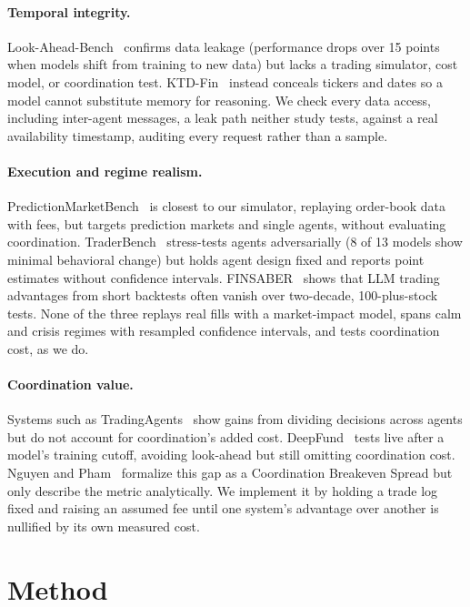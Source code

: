 \documentclass{article}
\begin{document}
\paragraph{Temporal integrity.}

Look-Ahead-Bench~\cite{benhenda2026} confirms data leakage (performance drops over 15 points when models shift from training to new data) but lacks a trading simulator, cost model, or coordination test. KTD-Fin~\cite{zhu2026ktdfin} instead conceals tickers and dates so a model cannot substitute memory for reasoning. We check every data access, including inter-agent messages, a leak path neither study tests, against a real availability timestamp, auditing every request rather than a sample.

\paragraph{Execution and regime realism.}

PredictionMarketBench~\cite{arora2026} is closest to our simulator, replaying order-book data with fees, but targets prediction markets and single agents, without evaluating coordination. TraderBench~\cite{yuan2026traderbench} stress-tests agents adversarially (8 of 13 models show minimal behavioral change) but holds agent design fixed and reports point estimates without confidence intervals. FINSABER~\cite{li2025finsaber} shows that LLM trading advantages from short backtests often vanish over two-decade, 100-plus-stock tests. None of the three replays real fills with a market-impact model, spans calm and crisis regimes with resampled confidence intervals, and tests coordination cost, as we do.

\paragraph{Coordination value.}

Systems such as TradingAgents~\cite{xiao2024ta} show gains from dividing decisions across agents but do not account for coordination's added cost. DeepFund~\cite{li2025deepfund} tests live after a model's training cutoff, avoiding look-ahead but still omitting coordination cost. Nguyen and Pham~\cite{nguyen2026} formalize this gap as a Coordination Breakeven Spread but only describe the metric analytically. We implement it by holding a trade log fixed and raising an assumed fee until one system's advantage over another is nullified by its own measured cost.

\section{Method}
\end{document}
